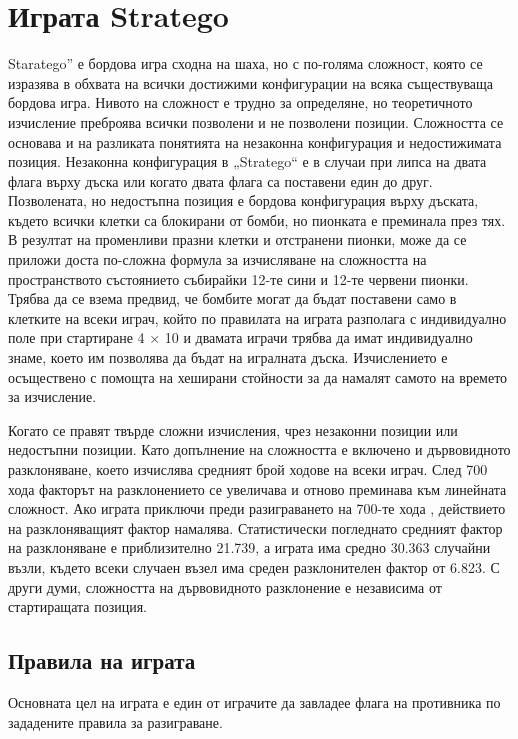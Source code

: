 \section{Играта Stratego}

Staratego” е бордова игра сходна на шаха, но с по-голяма сложност, която се изразява в обхвата на всички достижими конфигурации на всяка съществуваща бордова игра. Нивото на сложност е трудно за определяне, но теоретичното изчисление преброява всички позволени и не позволени позиции. Сложността се основава и на разликата понятията на незаконна конфигурация и недостижимата позиция. Незаконна конфигурация в „Stratego“ е в случаи при липса на двата флага върху дъска или когато двата флага са поставени един до друг. Позволената, но недостъпна позиция е бордова конфигурация върху дъската, където всички клетки са блокирани от бомби, но пионката е преминала през тях. В резултат на променливи празни клетки и отстранени пионки, може да се приложи доста по-сложна формула за изчисляване на сложността на пространството състоянието събирайки 12-те сини и 12-те червени пионки. Трябва да се взема предвид, че бомбите могат да бъдат поставени само в клетките на всеки играч, който по правилата на играта разполага с индивидуално поле при стартиране 4 × 10 и двамата играчи трябва да имат индивидуално знаме, което им позволява да бъдат на игралната дъска. Изчислението е осъществено с помощта на хеширани стойности за да намалят самото на времето за изчисление.

Когато се правят твърде сложни изчисления, чрез незаконни позиции или недостъпни  позиции. Като допълнение на сложността е включено и дървовидното разклоняване, което изчислява средният брой ходове на всеки играч. След 700 хода факторът на разклонението се увеличава и отново преминава към линейната сложност. Ако играта приключи преди разиграването на 700-те хода , действието на разклоняващият фактор намалява. Статистически погледнато средният фактор на разклоняване е приблизително 21.739, а играта има средно 30.363 случайни възли, където всеки случаен възел има среден разклонителен фактор от 6.823. С други думи, сложността на дървовидното разклонение е независима от стартиращата позиция.

\subsection{Правила на играта}

Основната цел на играта е един от играчите да завладее флага на противника по зададените правила за разиграване.

